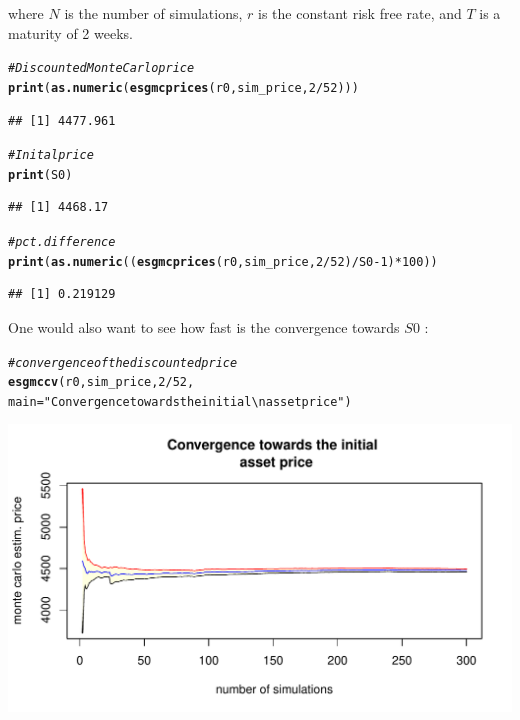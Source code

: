 \documentclass[a4paper]{article}\usepackage[]{graphicx}\usepackage[]{color}
\makeatletter
\def\maxwidth{ %
  \ifdim\Gin@nat@width>\linewidth
    \linewidth
  \else
    \Gin@nat@width
  \fi
}
\newcommand{\hlnum}[1]{\textcolor[rgb]{0.686,0.059,0.569}{#1}}%
\newcommand{\hlstr}[1]{\textcolor[rgb]{0.192,0.494,0.8}{#1}}%
\newcommand{\hlcom}[1]{\textcolor[rgb]{0.678,0.584,0.686}{\textit{#1}}}%
\newcommand{\hlopt}[1]{\textcolor[rgb]{0,0,0}{#1}}%
\newcommand{\hlstd}[1]{\textcolor[rgb]{0.345,0.345,0.345}{#1}}%
\newcommand{\hlkwc}[1]{\textcolor[rgb]{0.333,0.667,0.333}{#1}}%
\newcommand{\hlkwd}[1]{\textcolor[rgb]{0.737,0.353,0.396}{\textbf{#1}}}%
\newenvironment{kframe}{%
 \def\at@end@of@kframe{}%
 \ifinner\ifhmode%
  \def\at@end@of@kframe{\end{minipage}}%
  \begin{minipage}{\columnwidth}%
 \fi\fi%
 \def\FrameCommand##1{\hskip\@totalleftmargin \hskip-\fboxsep
 \colorbox{shadecolor}{##1}\hskip-\fboxsep
     \hskip-\linewidth \hskip-\@totalleftmargin \hskip\columnwidth}%
 \MakeFramed {\advance\hsize-\width
   \@totalleftmargin\z@ \linewidth\hsize
   \@setminipage}}%
 {\par\unskip\endMakeFramed%
 \at@end@of@kframe}
\newenvironment{knitrout}{}{} %
\makeatother
\begin{document}
where $N$ is the number of simulations, $r$ is the constant risk free rate, and $T$ is a maturity of 2 weeks. 

\begin{knitrout}
\color{fgcolor}\begin{kframe}
\begin{alltt}
\hlcom{# Discounted Monte Carlo price}
\hlkwd{print}\hlstd{(}\hlkwd{as.numeric}\hlstd{(}\hlkwd{esgmcprices}\hlstd{(r0, sim_price,} \hlnum{2}\hlopt{/}\hlnum{52}\hlstd{)))}
\end{alltt}
\begin{verbatim}
## [1] 4477.961
\end{verbatim}
\begin{alltt}
\hlcom{# Inital price}
\hlkwd{print}\hlstd{(S0)}
\end{alltt}
\begin{verbatim}
## [1] 4468.17
\end{verbatim}
\begin{alltt}
\hlcom{# pct. difference}
\hlkwd{print}\hlstd{(}\hlkwd{as.numeric}\hlstd{((}\hlkwd{esgmcprices}\hlstd{(r0, sim_price,} \hlnum{2}\hlopt{/}\hlnum{52}\hlstd{)}\hlopt{/}\hlstd{S0} \hlopt{-} \hlnum{1}\hlstd{)}\hlopt{*}\hlnum{100}\hlstd{))}
\end{alltt}
\begin{verbatim}
## [1] 0.219129
\end{verbatim}
\end{kframe}
\end{knitrout}

One would also want to see how fast is the convergence towards $S0$ :
\begin{knitrout}
\color{fgcolor}\begin{kframe}
\begin{alltt}
\hlcom{# convergence of the discounted price}
\hlkwd{esgmccv}\hlstd{(r0, sim_price,} \hlnum{2}\hlopt{/}\hlnum{52}\hlstd{,}
        \hlkwc{main} \hlstd{=} \hlstr{"Convergence towards the initial \textbackslash{}n asset price"}\hlstd{)}
\end{alltt}
\end{kframe}
\includegraphics[width=\maxwidth]{figure/_example_SVJD_cvS0-1} 

\end{knitrout}
\end{document}
